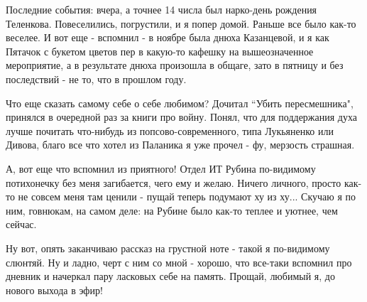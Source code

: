 \documentclass[12pt,a4paper]{article}
\begin{document}
Последние события: вчера, а точнее 14 числа был нарко-день рождения Теленкова. Повеселились, погрустили, и я попер домой. Раньше все было как-то веселее. И вот еще - вспомнил - в ноябре была днюха Казанцевой, и я как Пятачок с букетом цветов пер в какую-то кафешку на вышеозначенное мероприятие, а в результате днюха произошла в общаге, зато в пятницу и без последствий - не то, что в прошлом году.

Что еще сказать самому себе о себе любимом? Дочитал ``Убить пересмешника", принялся в очередной раз за книги про войну. Понял, что для поддержания духа лучше почитать что-нибудь из попсово-современного, типа Лукьяненко или Дивова, благо все что хотел из Паланика я уже прочел - фу, мерзость страшная.

А, вот еще что вспомнил из приятного! Отдел ИТ Рубина по-видимому потихонечку без меня загибается, чего ему и желаю. Ничего личного, просто как-то не совсем меня там ценили - пущай теперь подумают ху из ху... Скучаю я по ним, говнюкам, на самом деле: на Рубине было как-то теплее и уютнее, чем сейчас. 

Ну вот, опять заканчиваю рассказ на грустной ноте - такой я по-видимому слюнтяй. Ну и ладно, черт с ним со мной - хорошо, что все-таки вспомнил про дневник и начеркал пару ласковых себе на память. Прощай, любимый я, до нового выхода в эфир!
\end{document}

